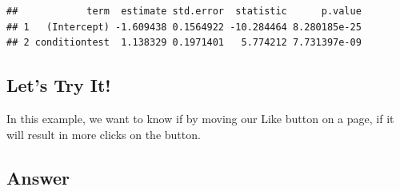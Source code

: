 \documentclass[]{article}
\newenvironment{Shaded}{\begin{snugshade}}{\end{snugshade}}
\newcommand{\KeywordTok}[1]{\textcolor[rgb]{0.13,0.29,0.53}{\textbf{#1}}}
\newcommand{\DataTypeTok}[1]{\textcolor[rgb]{0.13,0.29,0.53}{#1}}
\newcommand{\StringTok}[1]{\textcolor[rgb]{0.31,0.60,0.02}{#1}}
\newcommand{\OperatorTok}[1]{\textcolor[rgb]{0.81,0.36,0.00}{\textbf{#1}}}
\newcommand{\NormalTok}[1]{#1}
\begin{document}
\begin{Shaded}
\end{Shaded}

\begin{verbatim}
##            term  estimate std.error  statistic      p.value
## 1   (Intercept) -1.609438 0.1564922 -10.284464 8.280185e-25
## 2 conditiontest  1.138329 0.1971401   5.774212 7.731397e-09
\end{verbatim}

\subsection{Let's Try It!}\label{lets-try-it}

In this example, we want to know if by moving our Like button on a page,
if it will result in more clicks on the button.

\subsection{Answer}\label{answer}
\end{document}
